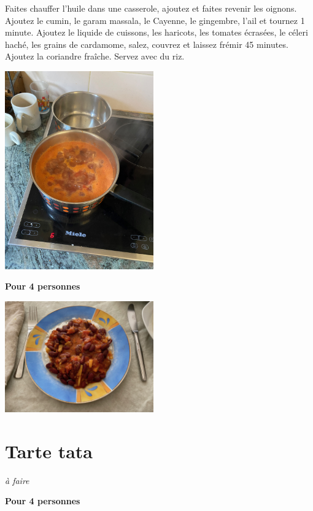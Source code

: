 \documentclass[10pt,a4paper]{report}
\begin{document}
\begin{multicols}{2}
        Faites chauffer l'huile dans une casserole, ajoutez et faites revenir les oignons. Ajoutez le cumin, le garam massala, le Cayenne, le gingembre, l'ail et tournez 1 minute. Ajoutez le liquide de cuissons, les haricots, les tomates écrasées, le céleri haché, les grains de cardamome, salez, couvrez et laissez frémir 45 minutes. Ajoutez la coriandre fraîche. Servez avec du riz.
        \newline
        \newline
        \centerline{\includegraphics[width=0.48\textwidth]{./assets/curry_de_haricots}}
        \newline
        \newline
        \textbf{Pour 4 personnes}
        \newline
        \newline
        \centerline{\includegraphics[width=0.48\textwidth]{./assets/curry_de_haricots_fin}}
    \end{multicols}

    \section{Tarte tata}

    \begin{multicols}{2}
        \parbox[1cm]{\textwidth}{
            \begin{description}
                \item \textit{à faire}
            \end{description}
        }
        \columnbreak

        \newline
        \textbf{Pour 4 personnes}
    \end{multicols}
\end{document}
